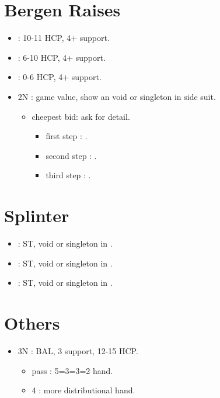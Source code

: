 \documentclass[12pt,twoside,a5paper]{report}%
\begin{document}
	\section*{Bergen Raises}
		\begin{itemize}
		\renewcommand{\labelitemi}{}
		\item {} : 10-11 HCP, 4+\he{} support.
		\item {} : 6-10 HCP, 4+\he{} support.
		\item {} : 0-6 HCP, 4+\he{} support.
		\item 2N : game value, show an void or singleton in side suit.
			\begin{itemize}
			\renewcommand{\labelitemi}{--}
			\item cheepest bid: ask for detail.
				\begin{itemize}
				\renewcommand{\labelitemi}{--}
					\item first step : \cl{}.
					\item second step : \di{}.
					\item third step : \sp{}.
				\end{itemize}
			\end{itemize}
		\end{itemize}

	\section*{Splinter}
		\begin{itemize}
		\renewcommand{\labelitemi}{}
		\item {} : ST, void or singleton in \cl{}.
		\item {} : ST, void or singleton in \di{}.
		\item {} : ST, void or singleton in \sp{}.
		\end{itemize}

	\section*{Others}
		\begin{itemize}
		\renewcommand{\labelitemi}{}
		\item 3N : BAL, 3\he{} support, 12-15 HCP.
			\begin{itemize}
			\renewcommand{\labelitemi}{--}
			\item pass : 5=3=3=2 hand.
			\item 4\he{} : more distributional hand.
			\end{itemize}
		\end{itemize}
	
\end{document}
